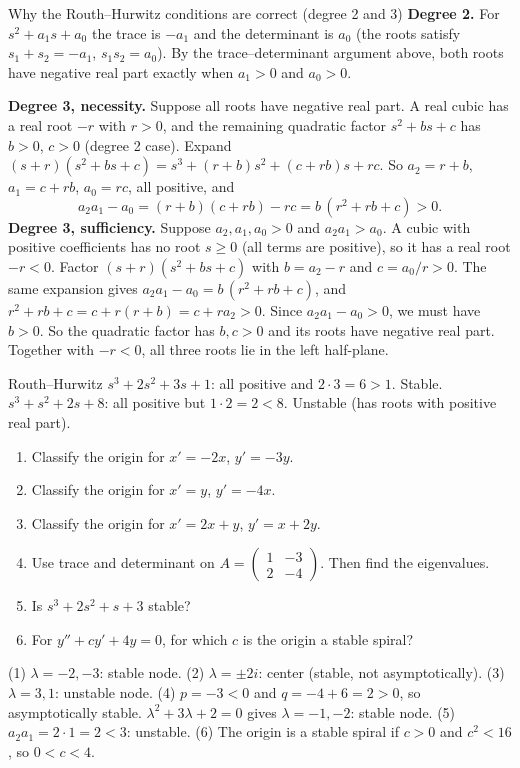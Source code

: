 \begin{derivbox}{Why the Routh--Hurwitz conditions are correct (degree 2 and 3)}
\textbf{Degree 2.} For $s^2 + a_1s + a_0$ the trace is $-a_1$ and the determinant is $a_0$ (the roots satisfy $s_1+s_2 = -a_1$, $s_1s_2 = a_0$). By the trace--determinant argument above, both roots have negative real part exactly when $a_1>0$ and $a_0>0$.

\textbf{Degree 3, necessity.} Suppose all roots have negative real part. A real cubic has a real root $-r$ with $r>0$, and the remaining quadratic factor $s^2 + bs + c$ has $b>0$, $c>0$ (degree 2 case). Expand $(s+r)(s^2+bs+c) = s^3 + (r+b)s^2 + (c+rb)s + rc$. So $a_2 = r+b$, $a_1 = c+rb$, $a_0 = rc$, all positive, and
\[ a_2a_1 - a_0 = (r+b)(c+rb) - rc = b\,(r^2 + rb + c)>0 . \]
\textbf{Degree 3, sufficiency.} Suppose $a_2,a_1,a_0>0$ and $a_2a_1>a_0$. A cubic with positive coefficients has no root $s\ge0$ (all terms are positive), so it has a real root $-r<0$. Factor $(s+r)(s^2+bs+c)$ with $b = a_2 - r$ and $c = a_0/r>0$. The same expansion gives $a_2a_1 - a_0 = b\,(r^2+rb+c)$, and $r^2 + rb + c = c + r(r+b) = c + ra_2>0$. Since $a_2a_1 - a_0>0$, we must have $b>0$. So the quadratic factor has $b,c>0$ and its roots have negative real part. Together with $-r<0$, all three roots lie in the left half-plane.
\end{derivbox}

\begin{examplebox}{Routh--Hurwitz}
$s^3 + 2s^2 + 3s + 1$: all positive and $2\cdot3 = 6>1$. Stable.
$s^3 + s^2 + 2s + 8$: all positive but $1\cdot2 = 2 < 8$. Unstable (has roots with positive real part).
\end{examplebox}

\begin{practicebox}
\begin{enumerate}
  \item Classify the origin for $x' = -2x$, $y' = -3y$.
  \item Classify the origin for $x' = y$, $y' = -4x$.
  \item Classify the origin for $x' = 2x + y$, $y' = x + 2y$.
  \item Use trace and determinant on $A = \begin{pmatrix}1&-3\\2&-4\end{pmatrix}$. Then find the eigenvalues.
  \item Is $s^3 + 2s^2 + s + 3$ stable?
  \item For $y'' + cy' + 4y = 0$, for which $c$ is the origin a stable spiral?
\end{enumerate}
\end{practicebox}

\begin{answerbox}
(1) $\lambda=-2,-3$: stable node. \quad (2) $\lambda = \pm2i$: center (stable, not asymptotically). \quad (3) $\lambda = 3, 1$: unstable node. \quad (4) $p=-3<0$ and $q = -4+6 = 2>0$, so asymptotically stable. $\lambda^2+3\lambda+2=0$ gives $\lambda=-1,-2$: stable node. \quad (5) $a_2a_1 = 2\cdot1 = 2 < 3$: unstable. \quad (6) The origin is a stable spiral if $c>0$ and $c^2 < 16$, so $0<c<4$.
\end{answerbox}
